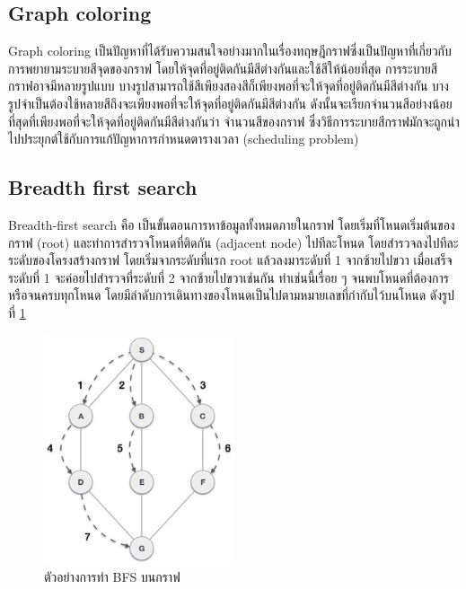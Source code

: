 \subsection{Graph coloring}
 
Graph coloring เป็นปัญหาที่ได้รับความสนใจอย่างมากในเรื่องทฤษฎีกราฟซึ่งเป็นปัญหาที่เกี่ยวกับการพยายามระบายสีจุดของกราฟ โดยให้จุดที่อยู่ติดกันมีสีต่างกันและใช้สีให้น้อยที่สุด
การระบายสีกราฟอาจมีหลายรูปแบบ บางรูปสามารถใช้สีเพียงสองสีก็เพียงพอที่จะให้จุดที่อยู่ติดกันมีสีต่างกัน บางรูปจำเป็นต้องใช้หลายสีถึงจะเพียงพอที่จะให้จุดที่อยู่ติดกันมีสีต่างกัน 
ดังนั้นจะเรียกจำนวนสีอย่างน้อยที่สุดที่เพียงพอที่จะให้จุดที่อยู่ติดกันมีสีต่างกันว่า จำนวนสีของกราฟ ซึ่งวิธีการระบายสีกราฟมักจะถูกนำไปประยุกต์ใช้กับการแก้ปัญหาการกำหนดตารางเวลา (scheduling problem) 
\subsection{Breadth first search}
Breadth-first search คือ เป็นขั้นตอนการหาข้อมูลทั้งหมดภายในกราฟ โดยเริ่มที่โหนดเริ่มต้นของกราฟ (root) และทำการสำรวจโหนดที่ติดกัน (adjacent node) ไปทีละโหนด โดยสำรวจลงไปทีละระดับของโครงสร้างกราฟ โดยเริ่มจากระดับที่แรก root แล้วลงมาระดับที่ 1 จากซ้ายไปขวา เมื่อเสร็จระดับที่ 1 จะค่อยไปสำรวจที่ระดับที่ 2 จากซ้ายไปขวาเช่นกัน ทําเช่นนี้เรื่อย ๆ
จนพบโหนดที่ต้องการ หรือจนครบทุกโหนด โดยมีลําดับการเดินทางของโหนดเป็นไปตามหมายเลขที่กํากับไว้บนโหนด
ดังรูปที่ \ref{fig:graph_bfs}
\begin{figure}
  \begin{center}
    \includegraphics[width=0.5\textwidth]{images/breadth_first_traversal.jpg}
  \end{center}
  \caption[ตัวอย่างการทำ BFS บนกราฟ]{ตัวอย่างการทำ BFS บนกราฟ}
  \label{fig:graph_bfs}     
\end{figure}
